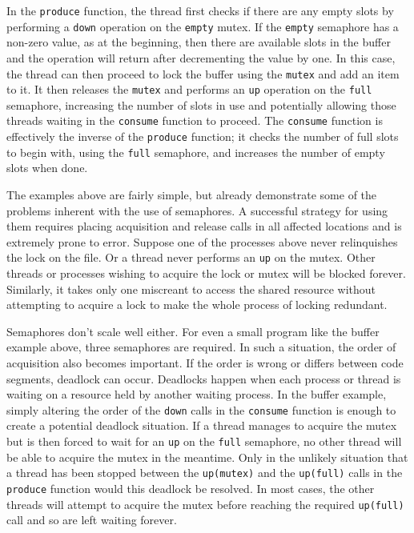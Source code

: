 In the \texttt{produce} function, the thread first checks if there are
any empty slots by performing a \texttt{down} operation on the \texttt{empty}
mutex.  If the \texttt{empty} semaphore has a non-zero value, as at
the beginning, then there are available slots in the buffer and the
operation will return after decrementing the value by one.  In this
case, the thread can then proceed to lock the buffer using the
\texttt{mutex} and add an item to it.  It then releases the
\texttt{mutex} and performs an \texttt{up} operation on the \texttt{full}
semaphore, increasing the number of slots in use and potentially
allowing those threads waiting in the \texttt{consume} function to
proceed.  The \texttt{consume} function is effectively the inverse of
the \texttt{produce} function; it checks the number of full slots to
begin with, using the \texttt{full} semaphore, and increases the
number of empty slots when done.

The examples above are fairly simple, but already demonstrate some of
the problems inherent with the use of semaphores.  A successful
strategy for using them requires placing acquisition and release calls
in all affected locations and is extremely prone to error.  Suppose
one of the processes above never relinquishes the lock on the file.
Or a thread never performs an \texttt{up} on the mutex.  Other threads or
processes wishing to acquire the lock or mutex will be blocked
forever.  Similarly, it takes only one miscreant to access the shared
resource without attempting to acquire a lock to make the whole
process of locking redundant.

Semaphores don't scale well either.  For even a small program like the
buffer example above, three semaphores are required.  In such a
situation, the order of acquisition also becomes important.  If the
order is wrong or differs between code segments, deadlock can occur.
Deadlocks happen when each process or thread is waiting on a resource
held by another waiting process.  In the buffer example, simply
altering the order of the \texttt{down} calls in the \texttt{consume}
function is enough to create a potential deadlock situation.  If a
thread manages to acquire the mutex but is then forced to wait for an
\texttt{up} on the \texttt{full} semaphore, no other thread will be able to
acquire the mutex in the meantime.  Only in the unlikely situation
that a thread has been stopped between the \texttt{up(mutex)} and the
\texttt{up(full)} calls in the \texttt{produce} function would this
deadlock be resolved.  In most cases, the other threads will attempt
to acquire the mutex before reaching the required \texttt{up(full)}
call and so are left waiting forever.


